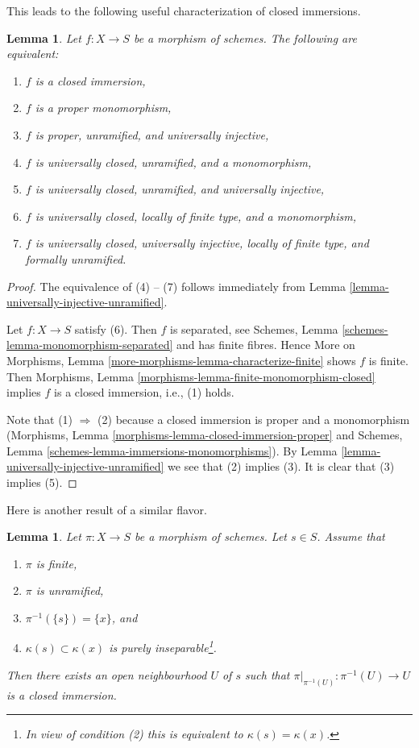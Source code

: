 \documentclass{stacks-project}
\theoremstyle{plain}
\newtheorem{lemma}[subsection]{Lemma}
\theoremstyle{definition}
\theoremstyle{remark}
\numberwithin{equation}{subsection}
\begin{document}
\noindent
This leads to the following useful characterization of closed immersions.

\begin{lemma}
\label{lemma-characterize-closed-immersion}
Let $f : X \to S$ be a morphism of schemes.
The following are equivalent:
\begin{enumerate}
\item $f$ is a closed immersion,
\item $f$ is a proper monomorphism,
\item $f$ is proper, unramified, and universally injective,
\item $f$ is universally closed, unramified, and a monomorphism,
\item $f$ is universally closed, unramified, and universally injective,
\item $f$ is universally closed, locally of finite type, and a monomorphism,
\item $f$ is universally closed, universally injective, locally of
finite type, and formally unramified.
\end{enumerate}
\end{lemma}

\begin{proof}
The equivalence of (4) -- (7) follows immediately from
Lemma \ref{lemma-universally-injective-unramified}.

\medskip\noindent
Let $f : X \to S$ satisfy (6). Then $f$ is separated, see
Schemes, Lemma \ref{schemes-lemma-monomorphism-separated}
and has finite fibres. Hence
More on Morphisms, Lemma \ref{more-morphisms-lemma-characterize-finite}
shows $f$ is finite. Then
Morphisms, Lemma \ref{morphisms-lemma-finite-monomorphism-closed}
implies $f$ is a closed immersion, i.e., (1) holds.

\medskip\noindent
Note that (1) $\Rightarrow$ (2) because a closed immersion is
proper and a monomorphism
(Morphisms, Lemma \ref{morphisms-lemma-closed-immersion-proper}
and
Schemes, Lemma \ref{schemes-lemma-immersions-monomorphisms}).
By
Lemma \ref{lemma-universally-injective-unramified}
we see that (2) implies (3). It is clear that (3) implies (5).
\end{proof}

\noindent
Here is another result of a similar flavor.

\begin{lemma}
\label{lemma-finite-unramified-one-point}
Let $\pi : X \to S$ be a morphism of schemes. Let $s \in S$.
Assume that
\begin{enumerate}
\item $\pi$ is finite,
\item $\pi$ is unramified,
\item $\pi^{-1}(\{s\}) = \{x\}$, and
\item $\kappa(s) \subset \kappa(x)$ is purely
inseparable\footnote{In view of condition (2)
this is equivalent to $\kappa(s) = \kappa(x)$.}.
\end{enumerate}
Then there exists an open neighbourhood $U$ of $s$ such that
$\pi|_{\pi^{-1}(U)} : \pi^{-1}(U) \to U$ is a closed immersion.
\end{lemma}
\end{document}
